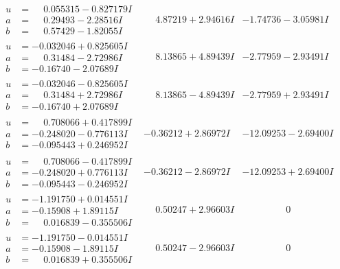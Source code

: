 \documentclass[1p]{elsarticle_modified}
\theoremstyle{definition}
\begin{document}
$$\begin{array}{c|c|c}
\begin{aligned}
u &= \phantom{-}0.055315 - 0.827179 I \\
a &= \phantom{-}0.29493 - 2.28516 I \\
b &= \phantom{-}0.57429 - 1.82055 I\end{aligned}
 & \phantom{-}4.87219 + 2.94616 I & -1.74736 - 3.05981 I \\ \hline\begin{aligned}
u &= -0.032046 + 0.825605 I \\
a &= \phantom{-}0.31484 - 2.72986 I \\
b &= -0.16740 - 2.07689 I\end{aligned}
 & \phantom{-}8.13865 + 4.89439 I & -2.77959 - 2.93491 I \\ \hline\begin{aligned}
u &= -0.032046 - 0.825605 I \\
a &= \phantom{-}0.31484 + 2.72986 I \\
b &= -0.16740 + 2.07689 I\end{aligned}
 & \phantom{-}8.13865 - 4.89439 I & -2.77959 + 2.93491 I \\ \hline\begin{aligned}
u &= \phantom{-}0.708066 + 0.417899 I \\
a &= -0.248020 - 0.776113 I \\
b &= -0.095443 + 0.246952 I\end{aligned}
 & -0.36212 + 2.86972 I & -12.09253 - 2.69400 I \\ \hline\begin{aligned}
u &= \phantom{-}0.708066 - 0.417899 I \\
a &= -0.248020 + 0.776113 I \\
b &= -0.095443 - 0.246952 I\end{aligned}
 & -0.36212 - 2.86972 I & -12.09253 + 2.69400 I \\ \hline\begin{aligned}
u &= -1.191750 + 0.014551 I \\
a &= -0.15908 + 1.89115 I \\
b &= \phantom{-}0.016839 - 0.355506 I\end{aligned}
 & \phantom{-}0.50247 + 2.96603 I & \phantom{-0.000000 } 0 \\ \hline\begin{aligned}
u &= -1.191750 - 0.014551 I \\
a &= -0.15908 - 1.89115 I \\
b &= \phantom{-}0.016839 + 0.355506 I\end{aligned}
 & \phantom{-}0.50247 - 2.96603 I & \phantom{-0.000000 } 0 \\ \hline\begin{aligned}

\end{aligned}
\end{array}$$
\end{document}
